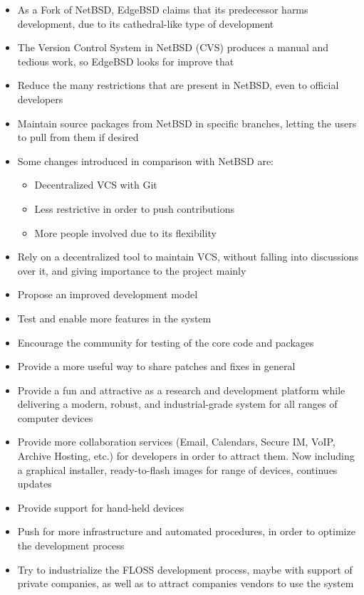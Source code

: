\documentclass[11pt]{article} %
\begin{document}
\begin{itemize}
	\item As a Fork of NetBSD, EdgeBSD claims that its predecessor harms development, due to its cathedral-like type of development
	\item The Version Control System in NetBSD (CVS) produces a manual and tedious work, so EdgeBSD looks for improve that
	\item Reduce the many restrictions that are present in NetBSD, even to official developers
	\item Maintain source packages from NetBSD in specific branches, letting the users to pull from them if desired
	\item Some changes introduced in comparison with NetBSD are:
		\begin{itemize}
			\item Decentralized VCS with Git
			\item Less restrictive in order to push contributions
			\item More people involved due to its flexibility
		\end{itemize}	
	\item Rely on a decentralized tool to maintain VCS, without falling into discussions over it, and giving importance to the project mainly
	\item Propose an improved development model
	\item Test and enable more features in the system
	\item Encourage the community for testing of the core code and packages
	\item Provide a more useful way to share patches and fixes in general
	\item Provide a fun and attractive as a research and development platform while delivering a modern, robust, and industrial-grade system for all ranges of computer devices
	\item Provide more collaboration services (Email, Calendars, Secure IM, VoIP, Archive Hosting, etc.) for developers in order to attract them. Now including a graphical installer, ready-to-flash images for range of devices, continues updates
	\item Provide support for hand-held devices
	\item Push for more infrastructure and automated procedures, in order to optimize the development process
	\item Try to industrialize the FLOSS development process, maybe with support of private companies, as well as to attract companies vendors to use the system

\end{itemize}
\end{document}

